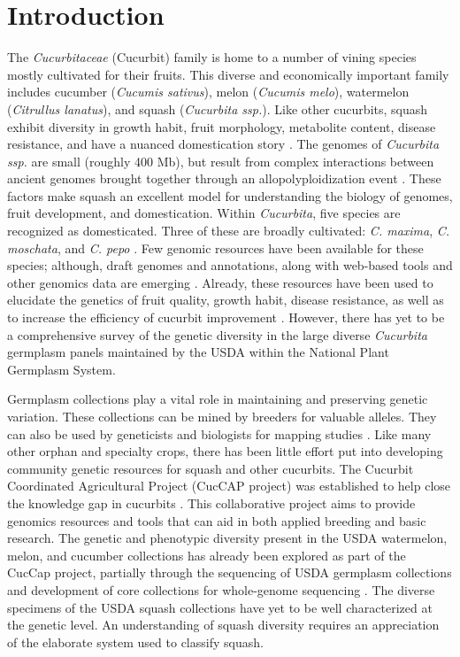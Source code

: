 \documentclass[utf8]{FrontiersinHarvard} %
\begin{document}
\section{Introduction}

The \emph{Cucurbitaceae} (Cucurbit) family is home to a number of vining species
mostly cultivated for their fruits.
This diverse and economically important family includes cucumber (\emph{Cucumis sativus}), melon (\emph{Cucumis melo}), watermelon (\emph{Citrullus lanatus}), and squash (\emph{Cucurbita ssp.})\citep{Ferriol}.
Like other cucurbits, squash exhibit diversity in growth habit, fruit morphology, metabolite content, disease resistance, and have a nuanced domestication story \citep{Chomicki2020,Paris2005}.
The genomes of \emph{Cucurbita ssp.} are small (roughly 400 Mb), but result from complex interactions between ancient genomes brought together through an allopolyploidization event \citep{Sun2017}.
These factors make squash an excellent model for understanding the biology of genomes, fruit development, and domestication.
Within \emph{Cucurbita}, five species are recognized as domesticated.
Three of these are broadly cultivated: \emph{C. maxima}, \emph{C. moschata}, and \emph{C. pepo} \citep{Ferriol}.
Few genomic resources have been available for these species; although, draft genomes and annotations, along with web-based tools and other genomics data are emerging \citep{Yu2022}.
Already, these resources have been used to elucidate the genetics of fruit quality, growth habit, disease resistance, as well as to increase the efficiency of cucurbit improvement \citep{MonteroPau2017,Zhong2017,Kazminska2018,Wu2019,Xanthopoulou2019,Hernandez2020}. However, there has yet to be a comprehensive survey of the genetic diversity in the large diverse \emph{Cucurbita} germplasm panels maintained by the USDA within the National Plant Germplasm System.

Germplasm collections play a vital role in maintaining and preserving genetic variation.
These collections can be mined by breeders for valuable alleles. They can also be used by geneticists and biologists for mapping studies \citep{McCouch2020}.
Like many other orphan and specialty crops, there has been little effort put into developing community genetic resources for squash and other cucurbits.
The Cucurbit Coordinated Agricultural Project (CucCAP project) was established to help close the knowledge gap in cucurbits \citep{Grumet2021}.
This collaborative project aims to provide genomics resources and tools that can aid in both applied breeding and basic research.
The genetic and phenotypic diversity present in the USDA watermelon, melon, and cucumber collections has already been explored as part of the CucCap project, partially through the sequencing of USDA germplasm collections and development of core collections for whole-genome sequencing \citep{Wang2021,Wang2018,Wu2019a}.
The diverse specimens of the USDA squash collections have yet to be well characterized at the genetic level. An understanding of squash diversity requires an appreciation of the elaborate system used to classify squash.
\end{document}
